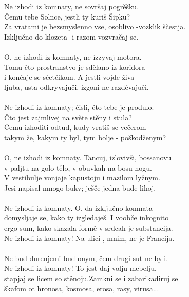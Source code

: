 \documentclass[11pt,a4paper]{book}
\begin{document}
Ne izhodi iz komnaty, ne sovršaj pogrěšku. \\
Čemu tebe Solnce, jestli ty kuriš Šipku? \\
Za vratami je bezsmyslenno vse, osoblivo -vozklik ščestja. \\
Izključno do klozeta -i razom vozvračaj se. \\
\\

O, ne izhodi iz komnaty, ne izzyvaj motora. \\
Tomu čto prostranstvo je sdělano iz koridora \\
i končaje se sčetčikom. A jestli vojde živa \\
ljuba, usta odkryvajuči, izgoni ne razděvajuči. \\
\\

Ne izhodi iz komnaty; čisli, čto tebe je produlo. \\
Čto jest zajmlivej na světe stěny i stula? \\
Čemu izhoditi odtud, kudy vratiš se večerom \\
takym že, kakym ty byl, tym bolje - poškodženym? \\
\\

O, ne izhodi iz komnaty. Tancuj, izlovivši, bossanovu\\
v paljtu na golo tělo, v obuvkah na bosu nogu. \\
V vestibulje vonjaje kapustoju i mazilom lyžnym. \\
Jesi napisal mnogo bukv; ješče jedna bude lihoj. \\
\\

Ne izhodi iz komnaty. O, da izključno komnata \\
domysljaje se, kako ty izgledaješ. I voobče inkognito \\
ergo sum, kako skazala formě v srdcah  je substancija. \\
Ne izhodi iz komnaty! Na ulici , mnim, ne je Francija. \\
\\

Ne bud durenjem! bud onym, čem drugi sut ne byli. \\
Ne izhodi iz komnaty! To jest daj volju mebelju, \\
stapjaj se licem so stěnoju.Zamkni se  i zabarikadiruj se \\
škafom ot hronosa, kosmosa, erosa, rasy, virusa... \\
\\
\end{document}
